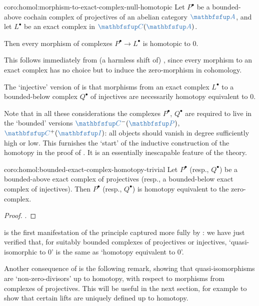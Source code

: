 \begin{coro}{}{coro:homol:morphism-to-exact-complex-null-homotopic}
  Let $P^\bullet$ be a bounded-above cochain complex of projectives of
  an abelian category $\categ{A}$, and let $L^\bullet$ be an exact
  complex in $\categ{C}(\categ{A})$.

  Then every morphism of complexes $P^\bullet \to L^\bullet$ is
  homotopic to $0$.
\end{coro}

This follows immediately from (a harmless shift of)
, since every morphism to an exact complex
has no choice but to induce the zero-morphism in cohomology.

The `injective' version of  is that
morphisms from an exact complex $L^\bullet$ to a bounded-below complex
$Q^\bullet$ of injectives are necessarily homotopy equivalent to $0$.

Note that in all these considerations the complexes $P^\bullet$,
$Q^\bullet$ are required to live in the `bounded' versions
$\categ{C}^-(\categ{P})$, $\categ{C}^+(\categ{I})$: all objects should
vanish in degree sufficiently high or low. This furnishes the `start'
of the inductive construction of the homotopy in the proof of
. It is an essentially inescapable feature
of the theory.

\begin{coro}{}{coro:homol:bounded-exact-complex-homotopy-trivial}
  Let $P^\bullet$ (resp., $Q^\bullet$) be a bounded-above exact
  complex of projectives (resp., a bounded-below exact complex of
  injectives). Then $P^\bullet$ (resp., $Q^\bullet$) is homotopy
  equivalent to the zero-complex.
\end{coro}
\begin{proof}
  .
\end{proof}

 is the first manifestation of the
principle captured more fully by : we have
just verified that, for suitably bounded complexes of projectives or
injectives, `quasi-isomorphic to $0$' is the same as `homotopy
equivalent to $0$'.

Another consequence of  is the following
remark, showing that quasi-isomorphisms are `non-zero-divisors' up to
homotopy, with respect to morphisms from complexes of projectives.
This will be useful in the next section, for example to show that
certain lifts are uniquely defined up to homotopy.

